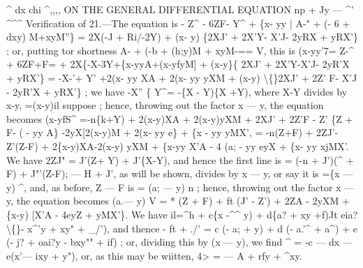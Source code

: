 \documentclass[11pt,a4paper]{book}
\begin{document}
\textasciicircum{}
dx
chi
\textasciicircum{},,,,
ON THE GENERAL DIFFERENTIAL EQUATION
np + Jy --- \textasciicircum{}'
\textasciicircum{}\textasciicircum{}\textasciicircum{}
Verification of
21.---The equation
is
- Z\textasciicircum{} - 6ZF- Y\textasciicircum{} + \{x- yy
| A-" + (- 6 + dxy) M+xyM''\}
= 2X(-J + Ri/-2Y) + (x- y) \{2XJ' + 2X'Y- X'J- 2yRX + yRX'\}
;
or, putting
tor shortness
A- + (-b + (h;y)M + xyM-== V,
this
is
(x-yy'7=
Z-\textasciicircum{} + 6ZF+F=
+ 2X\{-X-3Y+\{x-yyA+(x-yfyM]
+ (x-y\}\{ 2XJ' + 2X'Y-X'J- 2yR'X + yRX'\}
= -X-'+ Y' +2(x- yy XA + 2(x- yy yXM
+ (x-y) \textbackslash\{\}2XJ' + 2Z' F- X'J - 2yR'X + yRX'\}
;
we
have
-X'' \{ Y\textasciicircum{}= -\{X - Y)\{X +Y),
where X-Y
divides
by x-y,
=(x-y)il
suppose
;
hence, throwing out the
factor x --- y, the equation becomes
(x-yfS\textasciicircum{} =-n\{k+Y) + 2(x-y)XA + 2(x-y)yXM
+ 2XJ' + 2Z'F - Z' \{Z + F- (\guillemotleft{} - yy A\}
-2yX[2(x-y)M + 2(x- yy e\} + \{x - yy yMX',
= -n(Z+F) + 2ZJ'-Z'(Z-F)
+ 2\{x-y)XA-2(x-y) yXM
+ \{x-yy X'A - 4 (a; - yy eyX + \{x- yy xjMX'.
We have 2ZJ" = J'(Z+ Y) + J'\{X-Y), and hence the
first
line
is
= (-n + J')(\textasciicircum{} + F) + J"'(Z-F);
--- H + J', as
will
be
shown,
divides
by x --- y,
or
say
it
is =\{x --- y) \textasciicircum{},
and,
as
before,
Z --- F
is = (a; --- y) n
;
hence, throwing out
the
factor x --- y, the equation becomes
(a.--- y)\guillemotright{} V = * (Z + F) + ft (J' - Z') + 2ZA - 2yXM + \{x-y) [X'A - 4eyZ + yMX'\}.
We have
il=\textasciicircum{}h + c\{x -\textasciicircum{}\textasciicircum{} y) + d\{a? + xy +f)Jt eia? \textbackslash\{\}- x\textasciicircum{}'y + xy" +
\_\guillemotright{}/'),
and thence
- ft + ./' = c (- a; + y) + d (-
a.'\textasciicircum{} + a\textasciicircum{}) + e (- j? + oai?y - bxy"" + if)
;
or, dividing this by (x --- y), we
find
\textasciicircum{} = -c --- dx --- e(x'--- ixy + y"),
or, as
this may be
wiitten,
4> = --- A + rfy + \textasciicircum{}xy.
\end{document}

